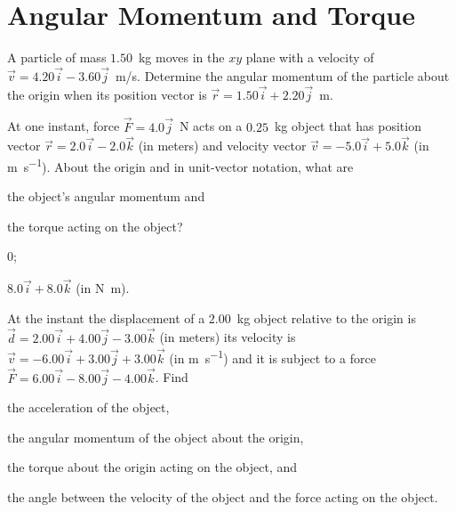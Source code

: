 \section{Angular Momentum and Torque}

\begin{problem}
	A particle of mass $1.50$~kg moves in the $xy$ plane with a velocity of $\vec v = 4.20\vec i - 3.60\vec j$~m/s. Determine the angular momentum of the particle about the origin when its position vector is $\vec r = 1.50 \vec i + 2.20 \vec j$~m.
\end{problem}

\begin{problem}
	At one instant, force $\vec F = 4.0 \vec j$~N acts on a $0.25$~kg object
	that has position vector $\vec r  = 2.0 \vec i - 2.0 \vec k$ (in meters) and velocity vector $\vec v = -5.0 \vec i + 5.0 \vec k$ (in \si{\meter\per\second}). About the origin and in unit-vector notation, what are 
	\begin{enumerate*}[label=(\alph*)]
		\item the object’s angular momentum and
		\item the torque acting on the object?
	\end{enumerate*}
	\begin{solution}
		\begin{enumerate*}[label=(\alph*)]
			\item 0; 
			\item $8.0 \vec i + 8.0 \vec k$ (in \si{\newton\meter}).
		\end{enumerate*}
	\end{solution}
\end{problem}

\begin{problem}
	At the instant the displacement of a $2.00$~kg object relative to the origin is $\vec d = 2.00 \vec i + 4.00 \vec j -3.00 \vec k$ (in meters) its velocity is $\vec v  = -6.00 \vec i + 3.00\vec j + 3.00 \vec k$ (in \si{\meter\per\second}) and it is subject to a force $\vec F = 6.00 \vec i - 8.00 \vec j - 4.00 \vec k$. Find 
	\begin{enumerate*}[label=(\alph*)]
		\item the acceleration of the object,
		\item the angular momentum of the object about the origin,
		\item the torque about the origin acting on the object, and 
		\item the angle between the velocity of the object and the force acting on the object.
	\end{enumerate*}
\end{problem}

